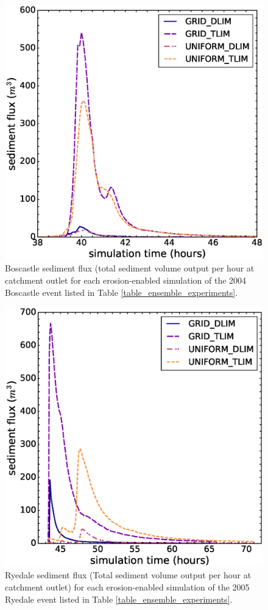 \begin{figure}[t]
\includegraphics[width=14cm]{chp06_figures_scripts/figure_boscastle_sedigraph_ensemble.eps}
\caption{Boscastle sediment flux (total sediment volume output per hour at catchment outlet for each erosion-enabled simulation of the 2004 Boscastle event listed in Table \ref{table_ensemble_experiments}.}
\label{fig_boscastle_sedigraph_ensemble}
\end{figure}

\begin{figure}[t]
\includegraphics[width=14cm]{chp06_figures_scripts/figure_ryedale_sedigraph_ensemble.eps}
\caption{Ryedale sediment flux (Total sediment volume output per hour at catchment outlet) for each erosion-enabled simulation of the 2005 Ryedale event listed in Table \ref{table_ensemble_experiments}.}
\label{fig_ryedale_sedigraph_ensemble}
\end{figure}

